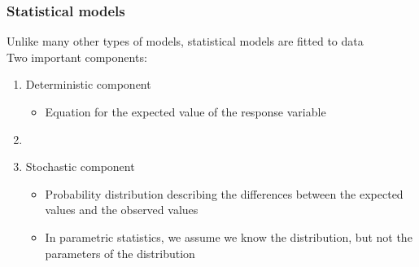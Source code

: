 \documentclass[color=usenames,dvipsnames]{beamer}\usepackage[]{graphicx}\usepackage[]{color}
\begin{document}
\begin{frame}
  \frametitle{Statistical models}
  \large
  {Unlike many other types of models, statistical models are fitted to data \\}
  \pause
  \vspace{12pt} %
  {Two important components: \\}
  \vspace{6pt}
  \begin{enumerate}
    \large
    \item<2-> Deterministic component%
      \begin{itemize}
        \normalsize
        \item Equation for the expected value of the response
          variable %
      \end{itemize}
    \item[]
    \item<3-> Stochastic component %
      \begin{itemize}
        \normalsize
        \item<3-> Probability distribution %
          describing the differences
          between the expected values and the observed values
        \item<4-> In parametric statistics, we assume we know the
          distribution, but not the parameters of the distribution
      \end{itemize}
  \end{enumerate}
\end{frame}




\end{document}
